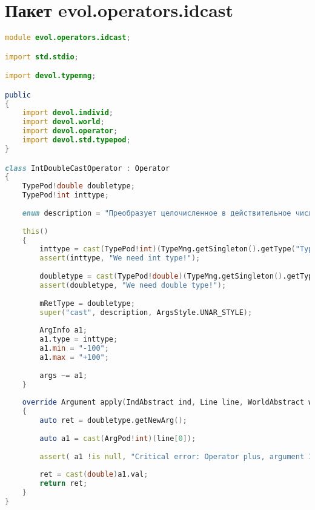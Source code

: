 \documentclass[russian,utf8,emptystyle]{eskdtext}
\begin{document}
\section{Пакет evol.operators.idcast}
\begin{lstlisting}[language=D]
module evol.operators.idcast;

import std.stdio;

import devol.typemng;

public
{
    import devol.individ;
    import devol.world;
    import devol.operator;
    import devol.std.typepod;
}

class IntDoubleCastOperator : Operator
{
    TypePod!double doubletype;
    TypePod!int inttype;
    
    enum description = "Преобразует целочисленное в действительное число.";
    
    this()
    {
        inttype = cast(TypePod!int)(TypeMng.getSingleton().getType("Typeint"));
        assert(inttype, "We need int type!");
        
        doubletype = cast(TypePod!double)(TypeMng.getSingleton().getType("Typedouble"));
        assert(doubletype, "We need double type!");
        
        mRetType = doubletype;
        super("cast", description, ArgsStyle.UNAR_STYLE);
        
        ArgInfo a1;
        a1.type = inttype;
        a1.min = "-100";
        a1.max = "+100";
        
        args ~= a1;
    }
    
    override Argument apply(IndAbstract ind, Line line, WorldAbstract world)
    {
        auto ret = doubletype.getNewArg();
        
        auto a1 = cast(ArgPod!int)(line[0]);
        
        assert( a1 !is null, "Critical error: Operator plus, argument 1 isn't a right value!");
        
        ret = cast(double)a1.val;
        return ret;
    }   
}
\end{lstlisting}
\end{document}
